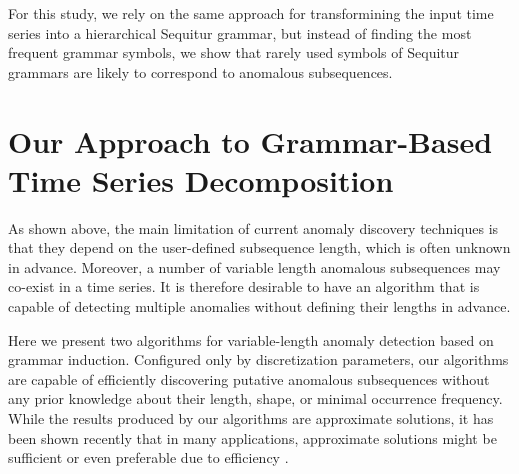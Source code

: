 \documentclass{llncs}
\begin{document}
For this study, we rely on the same approach for transformining the input time series into a hierarchical Sequitur grammar, but instead of finding the most frequent grammar symbols, we show that rarely used symbols of Sequitur grammars are likely to correspond to anomalous subsequences.

\section{Our Approach to Grammar-Based Time Series Decomposition}
As shown above, the main limitation of current anomaly discovery techniques is that they depend on the user-defined subsequence length, which is often unknown in advance. Moreover, a number of variable length anomalous subsequences may co-exist in a time series. It is therefore desirable to have an algorithm that is capable of detecting multiple anomalies without defining their lengths in advance.

Here we present two algorithms for variable-length anomaly detection based on grammar induction. Configured only by discretization parameters, our algorithms are capable of efficiently discovering putative anomalous subsequences without any prior knowledge about their length, shape, or minimal occurrence frequency. While the results produced by our algorithms are approximate solutions, it has been shown recently that in many applications, approximate solutions might be sufficient or even preferable due to efficiency \cite{grammarviz}. 


\end{document}
